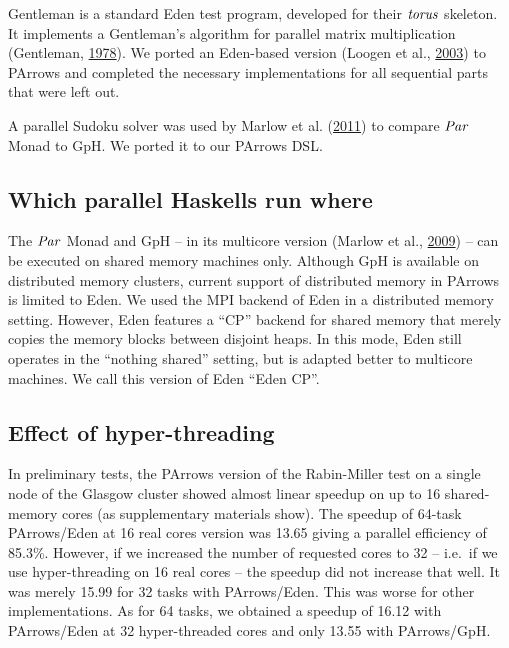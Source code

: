 \documentclass[paper=A4,twoside=true,openright,parskip=full,chapterprefix=true,headings=normal,bibliography=totoc,listof=totoc,titlepage=on,captions=tableabove,draft=false,british]{scrreprt}%
\renewcommand{\enquote}[1]{{``}#1{''}}
\begin{document}
Gentleman is a standard Eden test program, developed for their \ensuremath{\Varid{torus}}
skeleton. It implements a Gentleman's algorithm for parallel matrix
multiplication (Gentleman, \protect\hyperlink{ref-Gentleman1978}{1978}).
We ported an Eden-based version (Loogen et al.,
\protect\hyperlink{ref-Eden:SkeletonBookChapter02}{2003}) to PArrows and
completed the necessary implementations for all sequential parts that
were left out.

A parallel Sudoku solver was used by Marlow et al.
(\protect\hyperlink{ref-par-monad}{2011}) to compare \ensuremath{\Conid{Par}} Monad to GpH.
We ported it to our PArrows DSL.

\hypertarget{which-parallel-haskells-run-where}{%
\subsection{Which parallel Haskells run
where}\label{which-parallel-haskells-run-where}}

\label{sec:whichHaskellWhere}

The \ensuremath{\Conid{Par}} Monad and GpH -- in its multicore version (Marlow et al.,
\protect\hyperlink{ref-Marlow2009}{2009}) -- can be executed on shared
memory machines only. Although GpH is available on distributed memory
clusters, current support of distributed memory in PArrows is limited to
Eden. We used the MPI backend of Eden in a distributed memory setting.
However, Eden features a \enquote{CP} backend for shared memory that
merely copies the memory blocks between disjoint heaps. In this mode,
Eden still operates in the \enquote{nothing shared} setting, but is
adapted better to multicore machines. We call this version of Eden
\enquote{Eden CP}.

\hypertarget{effect-of-hyper-threading}{%
\subsection{Effect of hyper-threading}\label{effect-of-hyper-threading}}

\label{sec:effect-hyper-thread}

In preliminary tests, the PArrows version of the Rabin-Miller test on a
single node of the Glasgow cluster showed almost linear speedup on up to
16 shared-memory cores (as supplementary materials show). The speedup of
64-task PArrows/Eden at 16 real cores version was 13.65 giving a
parallel efficiency of 85.3\%. However, if we increased the number of
requested cores to 32 -- i.e.~if we use hyper-threading on 16 real cores
-- the speedup did not increase that well. It was merely 15.99 for 32
tasks with PArrows/Eden. This was worse for other implementations. As
for 64 tasks, we obtained a speedup of 16.12 with PArrows/Eden at 32
hyper-threaded cores and only 13.55 with PArrows/GpH.
\end{document}
